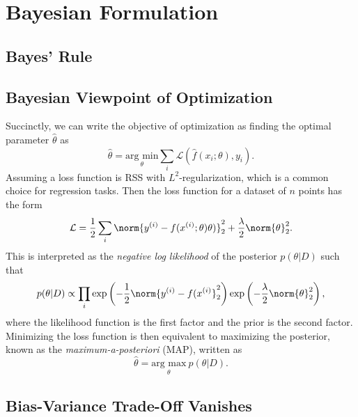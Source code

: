 \section{Bayesian Formulation}
\subsection{Bayes' Rule}
\subsection{Bayesian Viewpoint of Optimization}

Succinctly, we can write the objective of optimization as finding the optimal parameter $\hat{\theta}$ as 
\begin{equation}
	\hat{\theta} = \underset{\theta}{\text{arg min}} \sum_i\mathcal{L}(\hat{f}(x_i; \theta), y_i).
\end{equation}
Assuming a loss function is RSS with $L^2$-regularization, which is a common choice for regression tasks. Then the loss function for
a dataset of $n$ points has the form
\begin{equation}
	\mathcal{L} = \frac{1}{2}\sum_i \norm{y^{(i)} - f(x^{(i)}; \theta) \theta)}_2^2 + \frac{\lambda}{2}\norm{\theta}_2^2. 
\end{equation}
This is interpreted as the \textit{negative log likelihood} of the posterior $p(\theta|D)$ such that 
\begin{equation}
	p(\theta|D) \propto \prod_i\exp\left(-\frac{1}{2}\norm{y^{(i)} - f(x^{(i)}}_2^2\right)\exp\left(-\frac{\lambda}{2}\norm{\theta}_2^2\right),
\end{equation}
where the likelihood function is the first factor and the prior is the second factor. Minimizing the loss function is then equivalent to
maximizing the posterior, known as the \textit{maximum-a-posteriori} (MAP), written as
\begin{equation}
	\hat{\theta} = \underset{\theta}{\text{arg max}} \ p(\theta|D).
\end{equation}

\subsection{Bias-Variance Trade-Off Vanishes}

